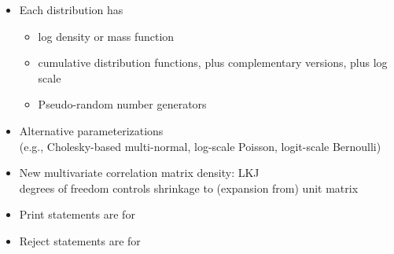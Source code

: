 \documentclass[10pt]{report}
\begin{document}
%
\begin{itemize}
\item Each distribution has
  \vspace*{-4pt}
  \begin{itemize}\small
  \item log density or mass function
  \item cumulative distribution functions, plus complementary versions,
    plus log scale
  \item Pseudo-random number generators
  \end{itemize}
\item Alternative parameterizations
  \\
  {\footnotesize (e.g., Cholesky-based multi-normal,
    log-scale Poisson, logit-scale Bernoulli)}
\item New multivariate correlation matrix density: LKJ
  \\
  {\footnotesize degrees of freedom controls 
    shrinkage to (expansion from) unit matrix}
\end{itemize}


%
\begin{itemize}
\item Print statements are for 
\item Reject statements are for 
\end{itemize}
\end{document}
